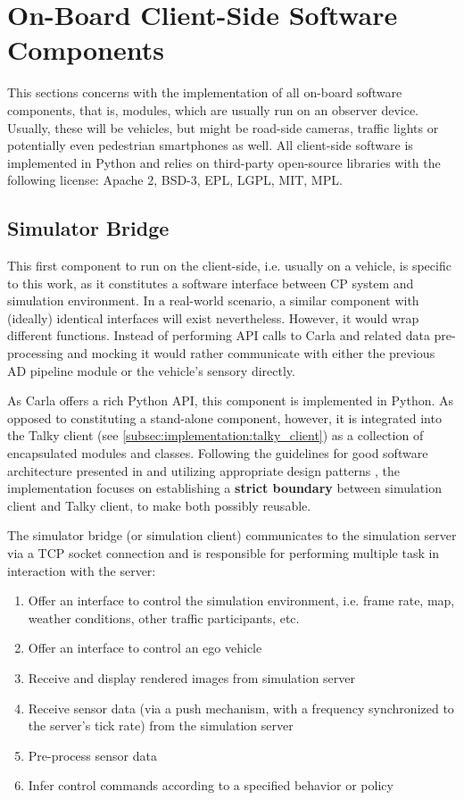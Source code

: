 \section{On-Board Client-Side Software Components}
\label{sec:implementation:on_board_client_side_software_components}
This sections concerns with the implementation of all on-board software components, that is, modules, which are usually run on an observer device. Usually, these will be vehicles, but might be road-side cameras, traffic lights or potentially even pedestrian smartphones as well. All client-side software is implemented in Python and relies on third-party open-source libraries with the following license: Apache 2, BSD-3, EPL, LGPL, MIT, MPL. 

\subsection{Simulator Bridge}
\label{subsec:implementation:simulator_bridge}
This first component to run on the client-side, i.e. usually on a vehicle, is specific to this work, as it constitutes a software interface between CP system and simulation environment. In a real-world scenario, a similar component with (ideally) identical interfaces will exist nevertheless. However, it would wrap different functions. Instead of performing API calls to Carla and related data pre-processing and mocking it would rather communicate with either the previous AD pipeline module or the vehicle's sensory directly. 

As Carla offers a rich Python API, this component is implemented in Python. As opposed to constituting a stand-alone component, however, it is integrated into the Talky client (see \cref{subsec:implementation:talky_client}) as a collection of encapsulated modules and classes. Following the guidelines for good software architecture presented in \cite{Martin2017} and utilizing appropriate design patterns \cite{EricFreemanElisabethFreemanBertBates2013}, the implementation focuses on establishing a \textbf{strict boundary} between simulation client and Talky client, to make both possibly reusable.

The simulator bridge (or simulation client) communicates to the simulation server via a TCP socket connection and is responsible for performing multiple task in interaction with the server:

\begin{enumerate}
	\item Offer an interface to control the simulation environment, i.e. frame rate, map, weather conditions, other traffic participants, etc.
	\item Offer an interface to control an ego vehicle
	\item Receive and display rendered images from simulation server
	\item Receive sensor data (via a push mechanism, with a frequency synchronized to the server's tick rate) from the simulation server
	\item Pre-process sensor data
	\item Infer control commands according to a specified behavior or policy
\end{enumerate}

